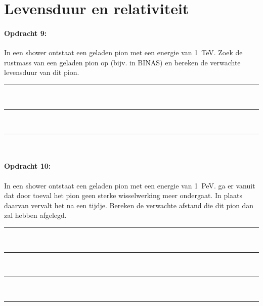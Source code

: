 \section{Levensduur en relativiteit}

\begin{minipage}[t]{1\columnwidth}\paragraph{Opdracht 9:}
In een shower ontstaat een geladen pion met een energie van \SI{1}{\tera\electronvolt}. Zoek de rustmass van een geladen pion op (bijv. in BINAS) en bereken de verwachte levensduur van dit pion.  
\begin{center}
    \rule{\textwidth}{0.3mm}\\
    \rule{\textwidth}{0.3mm}\\
    \rule{\textwidth}{0.3mm}\\
\end{center}
\end{minipage}
\bigskip{}

\begin{minipage}[t]{1\columnwidth}
\paragraph{Opdracht 10:}
In een shower ontstaat een geladen pion met een energie van \SI{1}{\peta\electronvolt}. ga er vanuit dat door toeval het pion geen sterke wisselwerking meer ondergaat. In plaats daarvan vervalt het na een tijdje. Bereken de verwachte afstand die dit pion dan zal hebben afgelegd.  
\begin{center}
    \rule{\textwidth}{0.3mm}\\
    \rule{\textwidth}{0.3mm}\\
    \rule{\textwidth}{0.3mm}\\
    \rule{\textwidth}{0.3mm}\\
\end{center}
\end{minipage}
\bigskip{}



